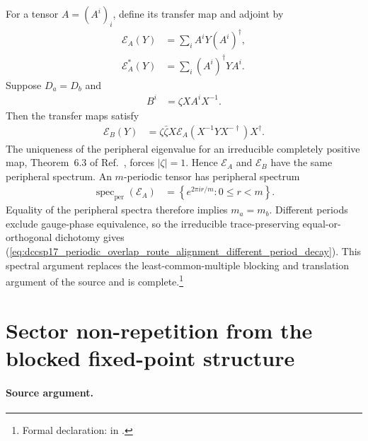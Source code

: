 \documentclass{article}
\begin{document}
For a tensor $A=(A^i)_i$, define its transfer map and adjoint by
\begin{align}
    \mathcal E_A(Y)
    &=\sum_i A^iY(A^i)^\dagger,
    \label{eq:dccsp17_periodic_overlap_route_alignment_transfer_map}\\
    \mathcal E_A^*(Y)
    &=\sum_i (A^i)^\dagger YA^i.
    \label{eq:dccsp17_periodic_overlap_route_alignment_transfer_adjoint}
\end{align}
Suppose $D_a=D_b$ and
\begin{align}
    B^i
    &=\zeta XA^iX^{-1}.
    \label{eq:dccsp17_periodic_overlap_route_alignment_gauge_phase_relation}
\end{align}
Then the transfer maps satisfy
\begin{align}
    \mathcal E_B(Y)
    &=\zeta\bar\zeta
      X\mathcal E_A\!\left(X^{-1}YX^{-\dagger}\right)X^\dagger.
    \label{eq:dccsp17_periodic_overlap_route_alignment_transfer_similarity}
\end{align}
The uniqueness of the peripheral eigenvalue for an irreducible completely
positive map, Theorem~6.3 of Ref.~\cite{Wolf2012Quantum}, forces
$|\zeta|=1$. Hence $\mathcal E_A$ and $\mathcal E_B$ have the same peripheral
spectrum. An $m$-periodic tensor has peripheral spectrum
\begin{align}
    \operatorname{spec}_{\mathrm{per}}(\mathcal E_A)
    &=\left\{e^{2\pi ir/m}:0\leq r<m\right\}.
    \label{eq:dccsp17_periodic_overlap_route_alignment_periodic_spectrum}
\end{align}
Equality of the peripheral spectra therefore implies $m_a=m_b$. Different
periods exclude gauge-phase equivalence, so the irreducible trace-preserving
equal-or-orthogonal dichotomy gives
(\ref{eq:dccsp17_periodic_overlap_route_alignment_different_period_decay}).
This spectral argument replaces the least-common-multiple blocking and
translation argument of the source and is complete.\footnote{Formal
declaration:
 in
.}

\section{Sector non-repetition from the blocked fixed-point structure}

\paragraph{Source argument.}
\end{document}
